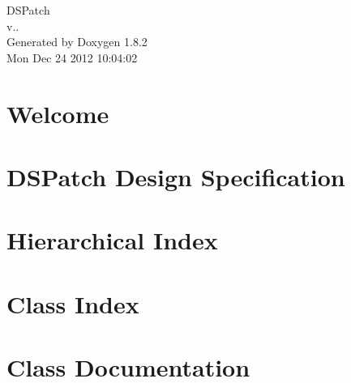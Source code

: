 \documentclass{book}
\begin{document}
\begin{titlepage}
\vspace*{7cm}
\begin{center}
{\Large D\-S\-Patch \\[1ex]\large v.. }\\
\vspace*{1cm}
{\large Generated by Doxygen 1.8.2}\\
\vspace*{0.5cm}
{\small Mon Dec 24 2012 10:04:02}\\
\end{center}
\end{titlepage}
\clearemptydoublepage
{}
\tableofcontents
\clearemptydoublepage
{}
\chapter{Welcome}
\label{index}
\chapter{D\-S\-Patch Design Specification}
\label{spec_page}

\chapter{Hierarchical Index}

\chapter{Class Index}

\chapter{Class Documentation}













\printindex
\end{document}
